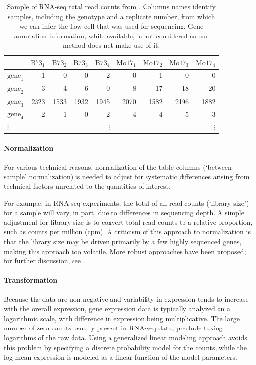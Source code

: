 \begin{table}[ht]
\centering
\caption{\small Sample of RNA-seq total read counts from \citep{paschold}. Columns names identify samples, including the genotype and a replicate number, from which we can infer the flow cell that was used for sequencing. Gene annotation information, while available, is not considered as our method does not make use of it.}
\vspace{.2in}
\label{tab:data}
\begin{tabular}{lrrrrrrrr}
  \hline
 & $\mbox{B73}_1$ & $\mbox{B73}_2$ & $\mbox{B73}_3$ & $\mbox{B73}_4$ & $\mbox{Mo17}_1$ & $\mbox{Mo17}_2$ & $\mbox{Mo17}_3$ & $\mbox{Mo17}_4$ \\ 
  \hline
$\mbox{gene}_1$ &   1 &   0 &   0 &   2 &   0 &   1 &   0 &   0 \\ 
$\mbox{gene}_2$ &   3 &   4 &   6 &   0 &   8 &  17 &  18 &  20 \\ 
$\mbox{gene}_3$ & 2323 & 1533 & 1932 & 1945 & 2070 & 1582 & 2196 & 1882 \\ 
$\mbox{gene}_4$ &   2 &   1 &   0 &   2 &   4 &   4 &   5 &   3 \\ 
$\vdots$ &    &    &    &  $\vdots$   &   &   &   &  $\vdots$ \\ 
   \hline
\end{tabular}
\end{table}

\paragraph{Normalization} For various technical reasons, normalization of the table columns (`between-sample' normalization) is needed to adjust for systematic differences arising from technical factors unrelated to the quantities of interest.

For example, in RNA-seq experiments, the total of all read counts (`library size') for a sample will vary, in part, due to differences in sequencing depth. A simple adjustment for library size is to convert total read counts to a relative proportion, such as counts per million (cpm). A criticism of this approach to normalization is that the library size may be driven primarily by a few highly sequenced genes, making this approach too volatile. More robust approaches have been proposed; for further discussion, see \citet{oshlack2010rna}.

\paragraph{Transformation} Because the data are non-negative and variability in expression tends to increase with the overall expression,  gene expression data is typically analyzed on a logarithmic scale, with difference in expression being multiplicative. The large number of zero counts usually present in RNA-seq data, preclude taking logarithms of the raw data. Using a generalized linear modeling approach avoids this problem by specifying a discrete probability model for the counts, while the log-mean expression is modeled as a linear function of the model parameters.

